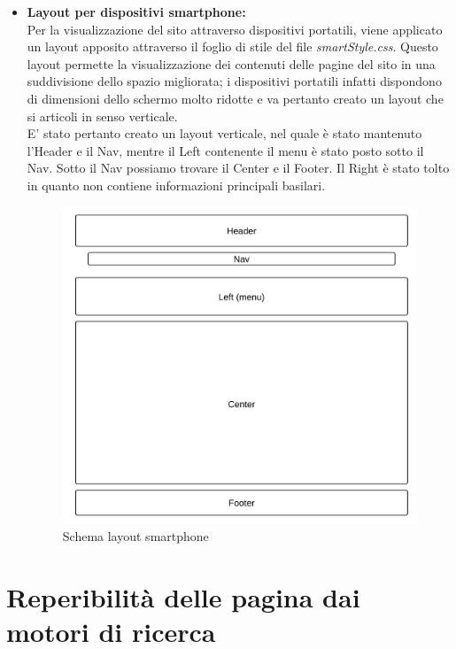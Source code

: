 \begin{itemize}
\item \textbf{Layout per dispositivi smartphone:}\\
Per la visualizzazione del sito attraverso dispositivi portatili, viene applicato un layout apposito attraverso il foglio di stile del file \textit{smartStyle.css}. Questo layout permette la visualizzazione dei contenuti delle pagine del sito in una suddivisione dello spazio migliorata; i dispositivi portatili infatti dispondono di dimensioni dello schermo molto ridotte e va pertanto creato un layout che si articoli in senso verticale.\\
E' stato pertanto creato un layout verticale, nel quale è stato mantenuto l'Header e il Nav, mentre il Left contenente il menu è stato posto sotto il Nav. Sotto il Nav possiamo trovare il Center e il Footer. Il Right è stato tolto in quanto non contiene informazioni principali basilari.


\begin{center}
\begin{figure}[H]
\centering
\includegraphics[scale=0.55]{images/smartLayout.png}
\caption{Schema layout smartphone}
\end{figure}
\end{center}

\end{itemize}



\section{Reperibilità delle pagina dai motori di ricerca}

